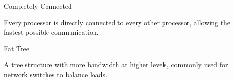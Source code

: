 \documentclass[a4paper, 10pt]{book}
\begin{document}
                    \vspace{0.3cm}
                    \noindent
                    \begin{minipage}{0.49\linewidth}
                        \begin{tcolorbox}[colframe=black!50, colback=white, size=small]

                            {\bold Completely Connected}
                            
                            Every processor is directly connected to every other processor, allowing the fastest possible communication.

                            \begin{center}
                                \begin{tikzpicture}

                                    
                                    
                                \end{tikzpicture}
                            \end{center}

                        \end{tcolorbox}
                    \end{minipage}
                    \hfill
                    \begin{minipage}{0.49\linewidth}
                        \begin{tcolorbox}[colframe=black!50, colback=white, size=small]
                            
                            {\bold Fat Tree}
                            
                            A tree structure with more bandwidth at higher levels, commonly used for network switches to balance loads.

                            \begin{center}
                                \begin{tikzpicture}

                                    
                                    
                                \end{tikzpicture}
                            \end{center}
                            
                        \end{tcolorbox}
                    \end{minipage}
                    
\end{document}
